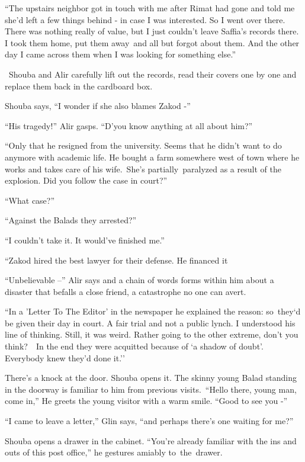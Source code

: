 \documentclass[twoside,11pt]{book}
\begin{document}
``The upstairs neighbor got in touch with me after Rimat had gone and told me she'd left a few things
behind - in case I was interested. So I went over there. There was nothing really of value, but I just couldn't leave
Saffia's records there. I took them home, put them away~and all but forgot about them. And the other day I came across
them when I was looking for something else.''

~Shouba and Alir carefully lift out the records, read their covers one by one and replace them back in the cardboard
box. 

Shouba says, ``I wonder if she also blames Zakod -'' 

``His tragedy!'' Alir gasps. ``D'you know anything at all about
him?'' 

``Only that he resigned from the university. Seems that he didn't want to do anymore with academic life. He
bought a farm somewhere west of town where he works and takes care of his wife.\ She's partially\ paralyzed as a result
of the explosion. Did you follow the case in court?'' 

``What case?'' 

``Against the Balads they arrested?'' 

``I couldn't take it. It would've finished me.'' 

``Zakod hired the best lawyer for their defense. He financed it

``Unbelievable --'' Alir says and a chain of words forms within him about a disaster that
befalls a close friend, a catastrophe no one can avert.

``In a {}'Letter To The Editor{}' in the newspaper he explained the reason: so\ they`d be given their day
in court. A fair trial and not a public lynch. I understood his line of thinking. Still, it was weird. Rather going to
the other extreme, don't you think?{\ \ }In the end they were acquitted because
of `a shadow of doubt'. Everybody knew they'd done it.''

There's a knock at the door. Shouba opens it. The skinny young Balad standing in the doorway is familiar to him from
previous visits.\ ``Hello there, young man, come in,'' He greets the young visitor with a
warm smile. ``Good to see you -'' 

``I came to leave a letter,'' Glin says, ``and perhaps there's one waiting for
me?''

Shouba opens a drawer in the cabinet. ``You're already familiar with the ins and outs of this post
office,'' he gestures amiably to~the~drawer.
\end{document}
